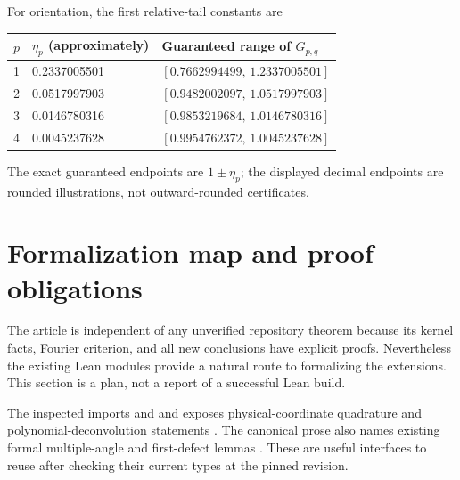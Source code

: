 \documentclass[11pt,a4paper]{article}
\numberwithin{equation}{section}
\theoremstyle{definition}
\theoremstyle{remark}
\begin{document}
For orientation, the first relative-tail constants are
\begin{center}
\begin{tabular}{rll}
\toprule
$p$ & $\eta_p$ (approximately) & Guaranteed range of $G_{p,q}$\\
\midrule
1&0.2337005501&$[0.7662994499,\,1.2337005501]$\\
2&0.0517997903&$[0.9482002097,\,1.0517997903]$\\
3&0.0146780316&$[0.9853219684,\,1.0146780316]$\\
4&0.0045237628&$[0.9954762372,\,1.0045237628]$\\
\bottomrule
\end{tabular}
\end{center}
The exact guaranteed endpoints are $1\pm\eta_p$; the displayed decimal
endpoints are rounded illustrations, not outward-rounded certificates.

\section{Formalization map and proof obligations}

The article is independent of any unverified repository theorem because
its kernel facts, Fourier criterion, and all new conclusions have explicit
proofs. Nevertheless the existing Lean modules provide a natural route
to formalizing the extensions. This section is a plan, not a report of a
successful Lean build.

The inspected  imports
 and  and exposes
physical-coordinate quadrature and polynomial-deconvolution statements
\cite{repoLean}. The canonical prose also names existing formal
multiple-angle and first-defect lemmas \cite{repoComb}. These are useful
interfaces to reuse after checking their current types at the pinned
revision.
\end{document}
